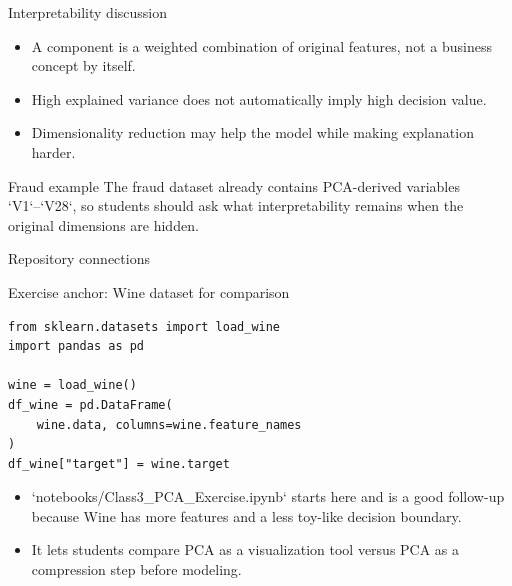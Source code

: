 \begin{frame}{Interpretability discussion}
\begin{itemize}
\item A component is a weighted combination of original features, not a business concept by itself.
\item High explained variance does not automatically imply high decision value.
\item Dimensionality reduction may help the model while making explanation harder.
\end{itemize}
\begin{block}{Fraud example}
The fraud dataset already contains PCA-derived variables `V1`--`V28`, so students should ask what interpretability remains when the original dimensions are hidden.
\end{block}
\coursefooter
\end{frame}

\begin{frame}{Repository connections}
\coursefooter
\end{frame}

\begin{frame}[fragile]{Exercise anchor: Wine dataset for comparison}
\begin{lstlisting}[style=coursepython]
from sklearn.datasets import load_wine
import pandas as pd

wine = load_wine()
df_wine = pd.DataFrame(
    wine.data, columns=wine.feature_names
)
df_wine["target"] = wine.target
\end{lstlisting}
\begin{itemize}
\item `notebooks/Class3_PCA_Exercise.ipynb` starts here and is a good follow-up because Wine has more features and a less toy-like decision boundary.
\item It lets students compare PCA as a visualization tool versus PCA as a compression step before modeling.
\end{itemize}
\coursefooter
\end{frame}

